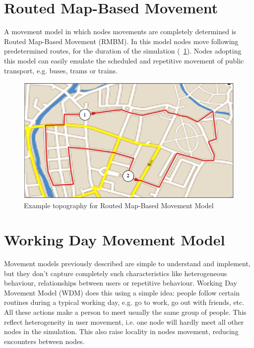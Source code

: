 \section{Routed Map-Based Movement}
A movement model in which nodes movements are completely determined is Routed Map-Based Movement (RMBM). In this model nodes move following predetermined routes, for the duration of the simulation (\figurename~\ref{fig:route_map}). Nodes adopting this model can easily emulate the scheduled and repetitive movement of public transport, e.g. buses, trams or trains.
\begin{figure}[htpb]
  \begin{center}
    \includegraphics[scale=0.6]{4-movimento/img/route_map.png}
    \caption{Example topography for Routed Map-Based Movement Model}    
    \label{fig:route_map}
  \end{center}
\end{figure}

\section{Working Day Movement Model}
\label{descrWDM}
Movement models previously described are simple to understand and implement, but they don't capture completely such characteristics like heterogeneous behaviour, relationships between users or repetitive behaviour. Working Day Movement Model (WDM) \cite{articoloWdm} does this using a simple idea: people follow certain routines during a typical working day, e.g. go to work, go out with friends, etc. All these actions make a person to meet usually the same group of people. This reflect heterogeneity in user movement, i.e. one node will hardly meet all other nodes in the simulation. This also raise locality in nodes movement, reducing encounters between nodes.
\\

